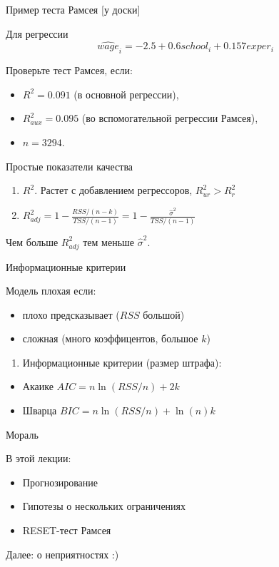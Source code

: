 \documentclass[ignorenonframetext,]{beamer}
\begin{document}
\begin{frame}{Пример теста Рамсея {[}у доски{]}}

Для регрессии \[
\widehat{wage}_i=-2.5+0.6 school_i + 0.157 exper_i
\]

Проверьте тест Рамсея, если:

\begin{itemize}
\item
  \(R^2=0.091\) (в основной регрессии),
\item
  \(R^2_{aux}=0.095\) (во вспомогательной регрессии Рамсея),
\item
  \(n=3294\).
\end{itemize}

\end{frame}

\begin{frame}{Простые показатели качества}

\begin{enumerate}
\def\labelenumi{\arabic{enumi}.}
\item
  \(R^2\). Растет с добавлением регрессоров, \(R^2_{ur}>R^2_r\)
\item
  \(R^2_{adj}=1-\frac{RSS/(n-k)}{TSS/(n-1)}=1-\frac{\hat{\sigma}^2}{TSS/(n-1)}\)
\end{enumerate}

Чем больше \(R^2_{adj}\) тем меньше \(\hat{\sigma}^2\).

\end{frame}

\begin{frame}{Информационные критерии}

Модель плохая если:

\begin{itemize}
\item
  плохо предсказывает (\(RSS\) большой)
\item
  сложная (много коэффицентов, большое \(k\))
\end{itemize}

\begin{enumerate}
\def\labelenumi{\arabic{enumi}.}
\setcounter{enumi}{2}
\itemsep1pt\parskip0pt
\item
  Информационные критерии (размер штрафа):
\end{enumerate}

\begin{itemize}
\item
  Акаике \(AIC=n \ln (RSS/n) + 2k\)
\item
  Шварца \(BIC=n \ln (RSS/n) + \ln(n) k\)
\end{itemize}

\end{frame}

\begin{frame}{Мораль}

В этой лекции:

\begin{itemize}
\item
  Прогнозирование
\item
  Гипотезы о нескольких ограничениях
\item
  RESET-тест Рамсея
\end{itemize}

Далее: о неприятностях :)

\end{frame}
\end{document}

